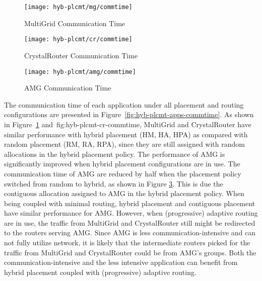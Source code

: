 
\begin{figure*}[t!]
    \centering
    \begin{subfigure}[t]{0.32\textwidth}
        \centering
        \texttt{[image: hyb-plcmt/mg/commtime]}
        \caption{MultiGrid Communication Time}
        \label{fig:hyb-plcmt-mg-commtime}
    \end{subfigure}\hfill
    \begin{subfigure}[t]{0.32\textwidth}
        \centering
        \texttt{[image: hyb-plcmt/cr/commtime]}
        \caption{CrystalRouter Communication Time}
        \label{fig:hyb-plcmt-cr-commtime}
    \end{subfigure}\hfill
    \begin{subfigure}[t]{0.32\textwidth}
        \centering
        \texttt{[image: hyb-plcmt/amg/commtime]}
        \caption{AMG Communication Time}
        \label{fig:hyb-plcmt-amg-commtime}
    \end{subfigure}
   \caption{Application communication time. Workload~ is running with all placement and routing configurations.}
   \label{fig:hyb-plcmt-apps-commtime}
\end{figure*}

The communication time of each application under all placement and routing configurations are presented in Figure~\ref{fig:hyb-plcmt-apps-commtime}. 
As shown in Figure~\ref{fig:hyb-plcmt-mg-commtime} and~{fig:hyb-plcmt-cr-commtime},
MultiGrid and CrystalRouter have similar performance with hybrid placement (HM, HA, HPA) as compared with random placement (RM, RA, RPA),
since they are still assigned with random allocations in the hybrid placement policy. 
The performance of AMG is significantly improved when hybrid placement configurations are in use. 
The communication time of AMG are reduced by half when the placement policy switched from random to hybrid, 
as shown in Figure \ref{fig:hyb-plcmt-amg-commtime}. 
This is due the contiguous allocation assigned to AMG in the hybrid placement policy. 
When being coupled with minimal routing, hybrid placement and contiguous placement have similar performance for AMG. 
However, when (progressive) adaptive routing are in use, the traffic from MultiGrid and CrystalRouter still might be redirected to the routers serving AMG. 
Since AMG is less communication-intensive and can not fully utilize network, 
it is likely that the intermediate routers picked for the traffic from MultiGrid and CrystalRouter could be from AMG's groups. Both the communication-intensive and the less intensive application can benefit from hybrid placement coupled with (progressive) adaptive routing.



